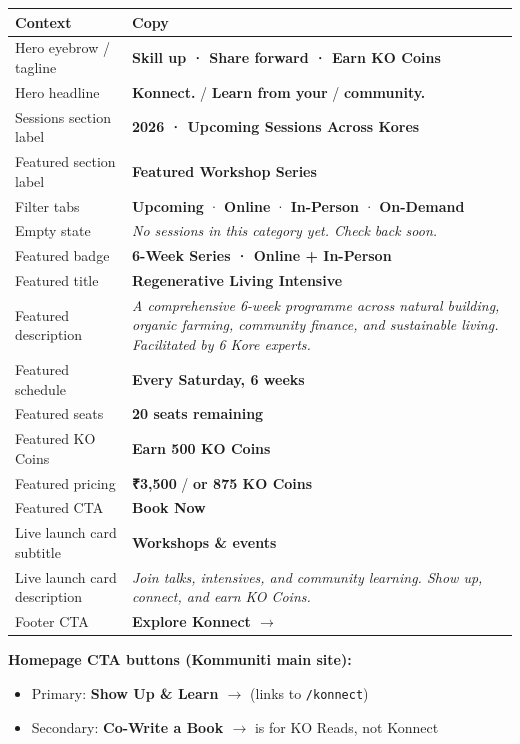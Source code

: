 \documentclass[11pt,a4paper]{report}
\begin{document}
\begin{longtable}{|l|l|}
\hline
Context & Copy \\ \hline
Hero eyebrow / tagline & \textbf{Skill up · Share forward · Earn KO Coins} \\ \hline
Hero headline & \textbf{Konnect.} / \textbf{Learn from your} / \textbf{community.} \\ \hline
Sessions section label & \textbf{2026 · Upcoming Sessions Across Kores} \\ \hline
Featured section label & \textbf{Featured Workshop Series} \\ \hline
Filter tabs & \textbf{Upcoming} · \textbf{Online} · \textbf{In-Person} · \textbf{On-Demand} \\ \hline
Empty state & \textit{No sessions in this category yet. Check back soon.} \\ \hline
Featured badge & \textbf{6-Week Series · Online + In-Person} \\ \hline
Featured title & \textbf{Regenerative Living Intensive} \\ \hline
Featured description & \textit{A comprehensive 6-week programme across natural building, organic farming, community finance, and sustainable living. Facilitated by 6 Kore experts.} \\ \hline
Featured schedule & \textbf{Every Saturday, 6 weeks} \\ \hline
Featured seats & \textbf{20 seats remaining} \\ \hline
Featured KO Coins & \textbf{Earn 500 KO Coins} \\ \hline
Featured pricing & \textbf{₹3,500} / \textbf{or 875 KO Coins} \\ \hline
Featured CTA & \textbf{Book Now} \\ \hline
Live launch card subtitle & \textbf{Workshops \& events} \\ \hline
Live launch card description & \textit{Join talks, intensives, and community learning. Show up, connect, and earn KO Coins.} \\ \hline
Footer CTA & \textbf{Explore Konnect $\rightarrow$} \\
\hline
\end{longtable}


\textbf{Homepage CTA buttons (Kommuniti main site):}

\begin{itemize}
  \item Primary: \textbf{Show Up \& Learn $\rightarrow$} (links to \texttt{/konnect})
  \item Secondary: \textbf{Co-Write a Book $\rightarrow$} is for KO Reads, not Konnect
\end{itemize}
\end{document}
